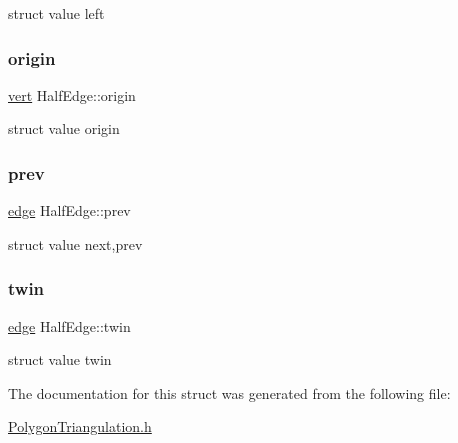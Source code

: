 struct value left \mbox{\label{struct_half_edge_a94238a660669b2937f9e1347b4c17b85}} 
\subsubsection{\texorpdfstring{origin}{origin}}
{\footnotesize\ttfamily \hyperlink{_polygon_triangulation_8h_a15bccd83c1e570e4a0ff17c42152989b}{vert} Half\+Edge\+::origin}

struct value origin \mbox{\label{struct_half_edge_a6c8df0be25a4c700e1565fd9fa371b52}} 
\subsubsection{\texorpdfstring{prev}{prev}}
{\footnotesize\ttfamily \hyperlink{_polygon_triangulation_8h_a4ef43ff5c6d42dacbc8ffd9c8cfdc189}{edge} Half\+Edge\+::prev}

struct value next,prev \mbox{\label{struct_half_edge_a7480da05d333a051d4156584981bed78}} 
\subsubsection{\texorpdfstring{twin}{twin}}
{\footnotesize\ttfamily \hyperlink{_polygon_triangulation_8h_a4ef43ff5c6d42dacbc8ffd9c8cfdc189}{edge} Half\+Edge\+::twin}

struct value twin 

The documentation for this struct was generated from the following file\+:\begin{DoxyCompactItemize}
\item 
\hyperlink{_polygon_triangulation_8h}{Polygon\+Triangulation.\+h}\end{DoxyCompactItemize}
